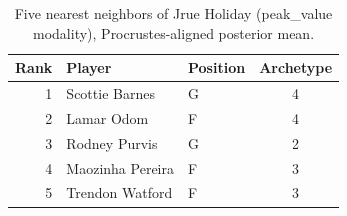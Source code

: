 \begin{table}[htbp]
  \centering\small
  \begin{tabular}{rllc}
    \toprule
    Rank & Player & Position & Archetype \\
    \midrule
    1 & Scottie Barnes & G & 4 \\
    2 & Lamar Odom & F & 4 \\
    3 & Rodney Purvis & G & 2 \\
    4 & Maozinha Pereira & F & 3 \\
    5 & Trendon Watford & F & 3 \\
    \bottomrule
  \end{tabular}
  \caption{Five nearest neighbors of Jrue Holiday (peak_value modality), Procrustes-aligned posterior mean.}
  \label{tab:Jrue_Holiday_neighbors_peak_value}
\end{table}

